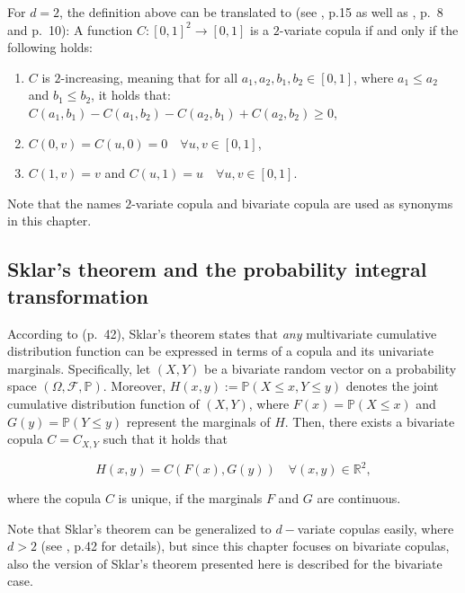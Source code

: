 \documentclass[
]{krantz}
\begin{document}
For \(d=2\), the definition above can be translated to (see \citet{durante2016}, p.15 as well as \citet{nelsen2006}, p.~8 and p.~10): A function \(C: [0,1]^2 \to [0,1]\) is a \(2\)-variate copula if and only if the following holds:

\begin{enumerate}
\def\labelenumi{\roman{enumi})}
\item
  \(C\) is \(2\)-increasing, meaning that for all \(a_1, a_2, b_1, b_2 \in [0,1]\), where \(a_1 \leq a_2\) and \(b_1 \leq b_2\), it holds that:
  \(C(a_1, b_1) - C(a_1, b_2) - C(a_2, b_1) + C(a_2, b_2) \geq 0\),
\item
  \(C(0,v) = C(u,0) = 0 \quad \forall u,v \in [0,1]\),
\item
  \(C(1,v) = v\) and \(C(u,1) = u \quad \forall u,v \in [0,1]\).
\end{enumerate}

Note that the names \(2\)-variate copula and bivariate copula are used as synonyms in this chapter.

\subsection{Sklar's theorem and the probability integral transformation}\label{skl}

According to \citet{durante2016} (p.~42), Sklar's theorem states that \emph{any} multivariate cumulative distribution function can be expressed in terms of a copula and its univariate marginals. Specifically, let \((X, Y)\) be a bivariate random vector on a probability space \((\Omega, \mathcal{F}, \mathbb{P})\). Moreover, \(H(x, y) := \mathbb{P}(X \leq x, Y \leq y)\) denotes the joint cumulative distribution function of \((X, Y)\), where \(F(x) = \mathbb{P}(X \leq x)\) and \(G(y) = \mathbb{P}(Y \leq y)\) represent the marginals of \(H\). Then, there exists a bivariate copula \(C = C_{X,Y}\) such that it holds that

\begin{equation}
H(x,y) = C(F(x), G(y)) \quad \forall (x, y) \in \mathbb{R}^2,
\label{eq:sklar}
\end{equation}

where the copula \(C\) is unique, if the marginals \(F\) and \(G\) are continuous.

Note that Sklar's theorem can be generalized to \(d-\)variate copulas easily, where \(d > 2\) (see \citet{durante2016}, p.42 for details), but since this chapter focuses on bivariate copulas, also the version of Sklar's theorem presented here is described for the bivariate case.
\end{document}
